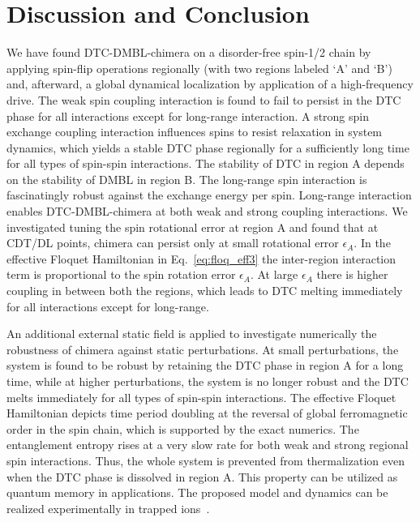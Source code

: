\documentclass[%
nofootinbib,
reprint,
superscriptaddress,
amsmath,amssymb,showkeys,
aps,
prb,
]{revtex4-2}
\begin{document}
	
	\section{\label{sec:level7} Discussion and Conclusion}
	
	We have found DTC-DMBL-chimera on a  disorder-free spin-1/2 chain by applying spin-flip operations regionally (with two regions labeled `A' and `B') and, afterward, a global dynamical localization by application of  a high-frequency drive. The weak spin coupling interaction is found to fail to persist in the DTC phase for all interactions except for long-range interaction. A strong spin exchange coupling interaction influences spins to resist relaxation in system dynamics, which yields a stable DTC phase regionally for a sufficiently long time for all types of spin-spin interactions. The stability of DTC in region A depends on the stability of DMBL in region B. The long-range spin interaction is fascinatingly robust against the exchange energy per spin. Long-range interaction enables DTC-DMBL-chimera at both weak and strong coupling interactions. We investigated tuning the spin rotational error at region A and found that at CDT/DL points, chimera can persist only at small rotational error $\epsilon_A$. In the effective Floquet Hamiltonian in Eq.~\ref{eq:floq_eff3} the inter-region interaction term is proportional to the spin rotation error $\epsilon_A$. At large $\epsilon_A$ there is higher coupling in between both the regions, which leads to DTC melting immediately for all interactions except for long-range. 
	
	An additional external static field is applied to investigate numerically the robustness of chimera against static perturbations. At small perturbations, the system is found to be robust by retaining the DTC phase in region A for a long time, while at higher perturbations, the system is no longer robust and the DTC melts immediately for all types of spin-spin interactions. The effective Floquet Hamiltonian depicts time period doubling at the reversal of global ferromagnetic order in the spin chain, which is supported by the exact numerics. The entanglement entropy rises at a very slow rate for both weak and strong regional spin interactions. Thus, the whole system is prevented from thermalization even when the DTC phase is dissolved in region A. This property can be utilized as quantum memory in applications. The proposed model and dynamics can be realized experimentally in trapped ions~\cite{sakurai_phys_nodate, Friedenauer2008}.
	
\end{document}
